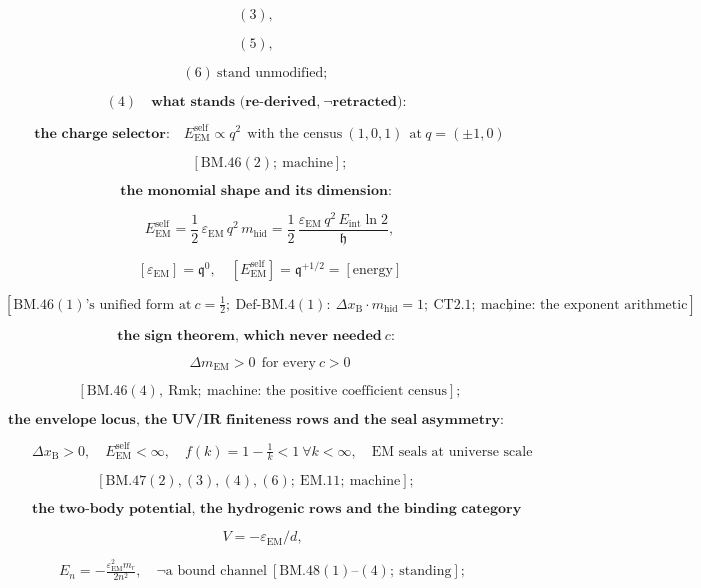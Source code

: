 \documentclass[11pt,openany]{report}
\theoremstyle{canonplain}
\theoremstyle{canondef}
\begin{document}
\[
(3),
\]

\[
(5),
\]

\[
(6)\ \text{stand unmodified};
\]

\[
(4)\quad\textbf{what stands (re-derived,}\ \neg\textbf{retracted):}
\]

\[
\qquad \textbf{the charge selector:}\quad E_{\mathrm{EM}}^{\mathrm{self}}\propto q^2\ \ \text{with the census}\ (1,0,1)\ \ \text{at}\ q=(\pm1,0)
\]

\[
\qquad [\mathrm{BM.46}(2);\ \text{machine}];
\]

\[
\textbf{the monomial shape and its dimension:}
\]

\[
\qquad E_{\mathrm{EM}}^{\mathrm{self}}=\frac12\,\varepsilon_{\mathrm{EM}}\,q^2\,m_{\mathrm{hid}}=\frac12\,\frac{\varepsilon_{\mathrm{EM}}\,q^2\,E_{\mathrm{int}}\ln2}{\mathfrak h},
\]

\[
\qquad [\varepsilon_{\mathrm{EM}}]=\mathfrak q^0,\quad[E_{\mathrm{EM}}^{\mathrm{self}}]=\mathfrak q^{+1/2}=[\text{energy}]
\]

\[
[\mathrm{BM.46}(1)\text{'s unified form at}\ c=\tfrac12;\ \mathrm{Def\text{-}BM.4}(1):\ \Delta x_{\mathrm B}\cdot m_{\mathrm{hid}}=1;\ \mathrm{CT2.1};\ \text{machine: the exponent arithmetic}];
\]

\[
\textbf{the sign theorem, which never needed}\ c\textbf{:}
\]

\[
\qquad \boxed{\ \Delta m_{\mathrm{EM}}>0\ \ \text{for every}\ c>0\ }
\]

\[
\qquad [\mathrm{BM.46}(4),\ \mathrm{Rmk};\ \text{machine: the positive coefficient census}];
\]

\[
\textbf{the envelope locus, the UV/IR finiteness rows and the seal asymmetry:}
\]

\[
\qquad \Delta x_{\mathrm B}>0,\quad E_{\mathrm{EM}}^{\mathrm{self}}<\infty,\quad f(k)=1-\tfrac1k<1\ \forall k<\infty,\quad\text{EM seals at universe scale}
\]

\[
[\mathrm{BM.47}(2),(3),(4),(6);\ \mathrm{EM.11};\ \text{machine}];
\]

\[
\qquad \textbf{the two-body potential, the hydrogenic rows and the binding category bar:}
\]

\[
\quad V=-\varepsilon_{\mathrm{EM}}/d,
\]

\[
\quad E_n=-\tfrac{\varepsilon_{\mathrm{EM}}^2m_r}{2n^2},\quad\neg\text{a bound channel}\ [\mathrm{BM.48}(1)\text{--}(4);\ \text{standing}];
\]
\end{document}
